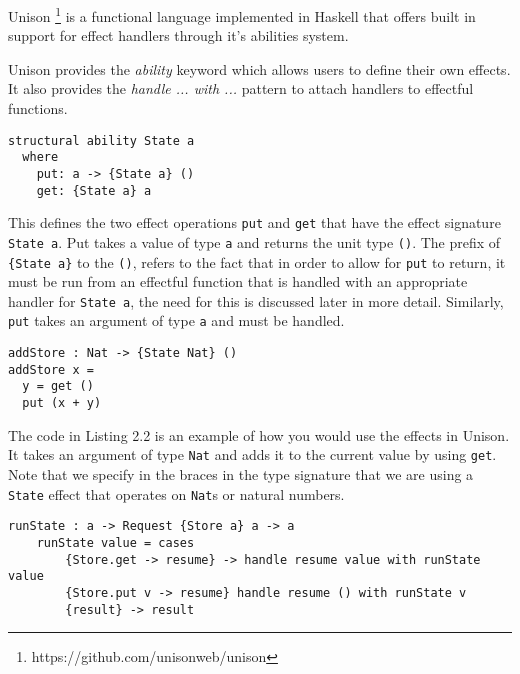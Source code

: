 \documentclass[logo,bsc,singlespacing,parskip]{infthesis}
\begin{document}
Unison \footnote{https://github.com/unisonweb/unison} is a
functional language implemented in Haskell that offers built in support for effect
handlers through it's abilities system.

Unison provides the \emph{ability} keyword which allows users to define their own
effects. It also provides the \emph{handle ... with ...} pattern to attach handlers to effectful functions.

\begin{lstlisting}[caption={The \emph{put} and \emph{get} example in Unison. Note that the \emph{structural} keyword refers to the fact that Unison stores type definitions as a hash. Even if we changed all the variable names it would still view it as the same type. To avoid that behaviour you can swap the \emph{structural} keyword for \emph{unique}}]
structural ability State a 
  where
    put: a -> {State a} ()
    get: {State a} a
\end{lstlisting}

This defines the two effect operations \texttt{put} and \texttt{get} that have
the effect signature \texttt{State a}. Put takes a value of type \texttt{a} and
returns the unit type \texttt{()}. The prefix of \texttt{\{State a\}} to the
\texttt{()}, refers to the fact that in order to allow for \texttt{put} to
return, it must be run from an effectful function that is handled with an
appropriate handler for \texttt{State a}, the need for this is discussed later
in more detail. Similarly, \texttt{put} takes an argument of type \texttt{a}
and must be handled.

\begin{lstlisting}[language=unison, caption={An example of an effectful function that uses the \texttt{State} effect}]
addStore : Nat -> {State Nat} ()
addStore x =
  y = get ()
  put (x + y)
\end{lstlisting}
\label{listing:addstore}

The code in Listing 2.2 is an example of how you would use the effects in
Unison. It takes an argument of type \texttt{Nat} and adds it to the current
value by using \texttt{get}. Note that we specify in the braces in the type
signature that we are using a \texttt{State} effect that operates on
\texttt{Nat}s or natural numbers.

\begin{lstlisting}[caption={The handler for the \texttt{State} effect}]
    runState : a -> Request {Store a} a -> a
    runState value = cases
        {Store.get -> resume} -> handle resume value with runState value
        {Store.put v -> resume} handle resume () with runState v
        {result} -> result

\end{lstlisting}
\end{document}
